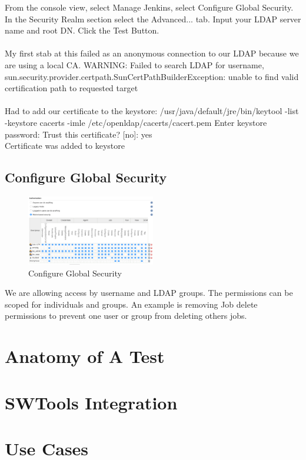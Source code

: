 \documentclass[10pt, conference, compsocconf]{IEEEtran}
\begin{document}
From the console view, select Manage Jenkins, select Configure Global Security. In the Security Realm section select the Advanced... tab. Input your LDAP server name and root DN. Click the Test Button.\\
\\
My first stab at this failed as an anonymous connection to our LDAP because we are using a local CA.
WARNING: Failed to search LDAP for username, 
sun.security.provider.certpath.SunCertPathBuilderException:
unable to find valid certification path to requested target\\
\\
Had to add our certificate to the keystore:
/usr/java/default/jre/bin/keytool -list -keystore cacerts -imle /etc/openldap/cacerts/cacert.pem
Enter keystore password: Trust this certificate? [no]:  yes\\
Certificate was added to keystore

\subsection{Configure Global Security}
\begin{figure}[H]
\centering
\includegraphics[width=0.5\textwidth]{Configure-Global-Security}
\caption{ Configure Global Security }
\label{fig:Configure-Global-Security}
\end{figure}
We are allowing access by username and LDAP groups. The permissions can be scoped for individuals and groups. An example is removing Job delete permissions to prevent one user or group from deleting others jobs. 

\section{Anatomy of A Test}
\label{sec:TestAnatomy}


\section{SWTools Integration}
\label{sec:SWToolsIntegration}


\section{Use Cases}
\label{sec:results}
\end{document}
